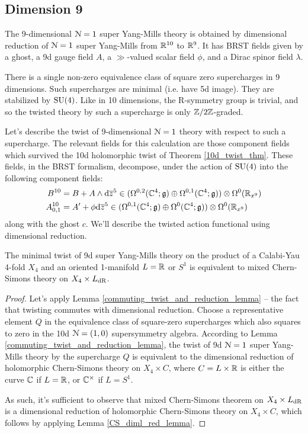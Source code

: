 \documentclass[10pt, oneside]{article}
\begin{document}
\subsection{Dimension 9}
The 9-dimensional $\mathcal{N}=1$ super Yang-Mills theory is obtained by dimensional reduction of $\mathcal{N}=1$ super Yang-Mills from $\mathbb R^{10}$ to $\mathbb R^9$.  It has BRST fields given by a ghost, a 9d gauge field $A$, a $\gg$-valued scalar field $\phi$, and a Dirac spinor field $\lambda$.

There is a single non-zero equivalence class of square zero supercharges in 9 dimensions. Such supercharges are minimal (i.e. have 5d image).  They are stabilized by $\mathrm{SU}(4)$.  Like in 10 dimensions, the R-symmetry group is trivial, and so the twisted theory by such a supercharge is only $\mathbb Z/2\mathbb Z$-graded.

Let's describe the twist of 9-dimensional $\mathcal{N}=1$ theory with respect to such a supercharge.  The relevant fields for this calculation are those component fields which survived the 10d holomorphic twist of Theorem \ref{10d_twist_thm}.  These fields, in the BRST formalism, decompose, under the action of $\mathrm{SU}(4)$ into the following component fields:
\begin{align*}
B^{10} &= B + A \wedge {\rm d} \overline{z}^5 \in (\Omega^{0,2}(\mathbb C^4; \mathfrak{g}) \oplus \Omega^{0,1}(\mathbb C^4; \mathfrak{g})) \otimes \Omega^0(\mathbb R_{x^9}) \\
A^{10}_{0,1} &= A' + \phi {\rm d} \overline{z}^5 \in (\Omega^{0,1}(\mathbb C^4; \mathfrak{g}) \oplus \Omega^0(\mathbb C^4; \mathfrak{g})) \otimes \Omega^0(\mathbb R_{x^9})
\end{align*}
along with the ghost $c$.  We'll describe the twisted action functional using dimensional reduction.

\begin{theorem} \label{9d_twist_thm}
The minimal twist of 9d super Yang-Mills theory on the product of a Calabi-Yau 4-fold $X_4$ and an oriented 1-manifold $L = \mathbb R$ or $S^1$ is equivalent to mixed Chern-Simons theory on $X_4 \times L_{\mathrm{dR}}$.
\end{theorem}

\begin{proof}
Let's apply Lemma \ref{commuting_twist_and_reduction_lemma} -- the fact that twisting commutes with dimensional reduction.  Choose a representative element $Q$ in the equivalence class of square-zero supercharges which also squares to zero in the 10d $\mathcal{N}=(1,0)$ supersymmetry algebra.  According to Lemma \ref{commuting_twist_and_reduction_lemma}, the twist of 9d $\mathcal{N}=1$ super Yang-Mills theory by the supercharge $Q$ is equivalent to the dimensional reduction of holomorphic Chern-Simons theory on $X_4 \times C$, where $C = L \times \mathbb R$ is either the curve $\mathbb C$ if $L = \mathbb R$, or $\mathbb C^\times$ if $L = S^1$. 

As such, it's sufficient to observe that mixed Chern-Simons theorem on $X_4 \times L_{\mathrm{dR}}$ is a dimensional reduction of holomorphic Chern-Simons theory on $X_4 \times C$, which follows by applying Lemma \ref{CS_diml_red_lemma}.
\end{proof}
\end{document}
